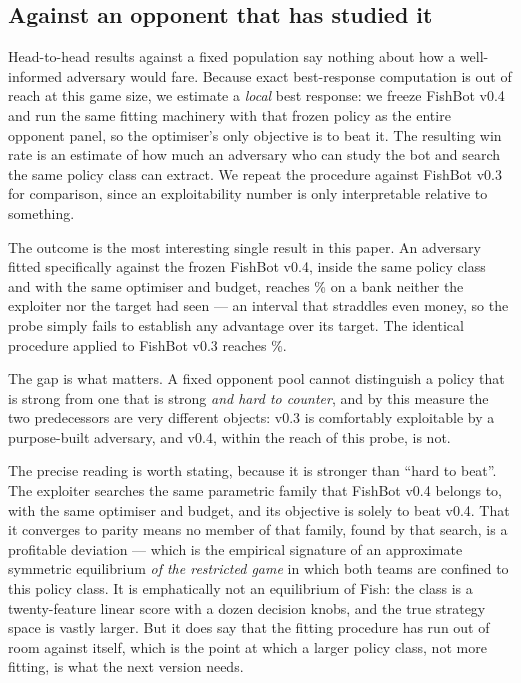 \subsection{Against an opponent that has studied it}
\label{sec:lbr}

Head-to-head results against a fixed population say nothing about how a
well-informed adversary would fare. Because exact best-response computation is
out of reach at this game size, we estimate a \emph{local} best response: we
freeze FishBot v0.4 and run the same fitting machinery with that frozen policy as
the entire opponent panel, so the optimiser's only objective is to beat it. The
resulting win rate is an estimate of how much an adversary who can study the bot
and search the same policy class can extract. We repeat the procedure against
FishBot v0.3 for comparison, since an exploitability number is only interpretable
relative to something.

The outcome is the most interesting single result in this paper. An adversary
fitted specifically against the frozen FishBot v0.4, inside the same policy class
and with the same optimiser and budget, reaches \numLBRFour\% on a bank neither
the exploiter nor the target had seen --- an interval that straddles even money,
so the probe simply fails to establish any advantage over its target. The identical procedure applied to FishBot v0.3 reaches \numLBRThree\%.

The gap is what matters. A fixed opponent pool cannot distinguish a policy that
is strong from one that is strong \emph{and hard to counter}, and by this measure
the two predecessors are very different objects: v0.3 is comfortably exploitable
by a purpose-built adversary, and v0.4, within the reach of this probe, is not.

The precise reading is worth stating, because it is stronger than ``hard to
beat''. The exploiter searches the same parametric family that FishBot v0.4
belongs to, with the same optimiser and budget, and its objective is solely to
beat v0.4. That it converges to parity means no member of that family, found by
that search, is a profitable deviation --- which is the empirical signature of an
approximate symmetric equilibrium \emph{of the restricted game} in which both
teams are confined to this policy class. It is emphatically not an equilibrium of
Fish: the class is a twenty-feature linear score with a dozen decision knobs, and
the true strategy space is vastly larger. But it does say that the fitting
procedure has run out of room against itself, which is the point at which a
larger policy class, not more fitting, is what the next version needs.

